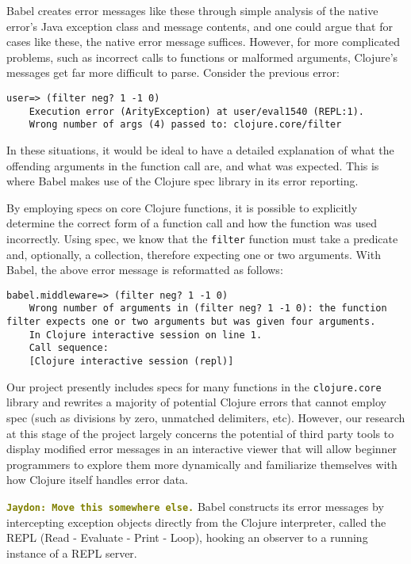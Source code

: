 \documentclass[12pt]{article}
\newcommand{\comment}[1]{{\bf \tt  {#1}}}
\newcommand{\jscomment}[1]{\textcolor{olive}{\comment{Jaydon: {#1}}}}
\begin{document}
Babel creates error messages like these through simple analysis of the native error's Java exception class and message contents, and one could argue that for cases like these, the native error message suffices. However, for more complicated problems, such as incorrect calls to functions or malformed arguments, Clojure's messages get far more difficult to parse. Consider the previous error:

\begin{lstlisting}[breaklines=true, basicstyle=\ttfamily]
    user=> (filter neg? 1 -1 0)
    Execution error (ArityException) at user/eval1540 (REPL:1).
    Wrong number of args (4) passed to: clojure.core/filter
\end{lstlisting}

In these situations, it would be ideal to have a detailed explanation of what the offending arguments in the function call are, and what was expected. This is where Babel makes use of the Clojure spec library in its error reporting.

By employing specs on core Clojure functions, it is possible to explicitly determine the correct form of a function call and how the function was used incorrectly. Using spec, we know that the \verb|filter| function must take a predicate and, optionally, a collection, therefore expecting one or two arguments. With Babel, the above error message is reformatted as follows:

\begin{lstlisting}[breaklines=true, basicstyle=\ttfamily]
    babel.middleware=> (filter neg? 1 -1 0)
    Wrong number of arguments in (filter neg? 1 -1 0): the function filter expects one or two arguments but was given four arguments.
    In Clojure interactive session on line 1.
    Call sequence:
    [Clojure interactive session (repl)]
\end{lstlisting}

Our project presently includes specs for many functions in the \verb|clojure.core| library and rewrites a majority of potential Clojure errors that cannot employ spec (such as divisions by zero, unmatched delimiters, etc). However, our research at this stage of the project largely concerns the potential of third party tools to display modified error messages in an interactive viewer that will allow beginner programmers to explore them more dynamically and familiarize themselves with how Clojure itself handles error data.

\jscomment{Move this somewhere else.}
Babel constructs its error messages by intercepting exception objects directly from the Clojure interpreter, called the REPL (Read - Evaluate - Print - Loop), hooking an observer to a running instance of a REPL server.
\end{document}
